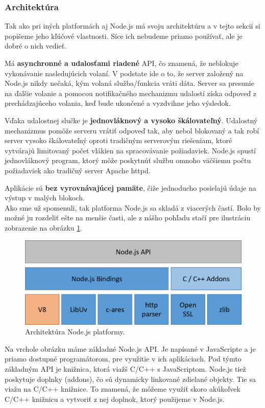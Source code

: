 \subsubsection{Architektúra}
Tak ako pri iných platformách aj Node.js má svoju architektúru a v tejto sekcií si popišeme jeho kľúčové vlastnosti. Síce ich nebudeme priamo používať, ale je dobré o nich vedieť.

Má \textbf{asynchronné a udalosťami riadené} API, čo znamená, že neblokuje vykonávanie nasledujúcich volaní. V podstate ide o to, že server založený na Node.js nikdy nečaká, kým volaná služba/funkcia vráti dáta. Server sa presunie na ďalšie volanie a pomocou notifikačného mechanizmu udalostí získa odpoveď z prechádzajúceho volania, keď bude ukončené a vyzdvihne jeho výsledok.

Vďaka udalostnej slučke je \textbf{jednovláknový a vysoko škálovateľný}. Udalostný mechanizmus pomôže serveru vrátiť odpoveď tak, aby nebol blokovaný a tak robí server vysoko škálovateľný oproti tradičným serverovým riešeniam, ktoré vytvárajú limitovaný počet vlákien na spracovávanie požiadaviek. Node.js spustí jednovláknový program, ktorý môže poskytnúť službu omnoho väčšiemu počtu požiadaviek ako tradičný server Apache httpd. 

Aplikácie sú \textbf{bez vyrovnávajúcej pamäte}, čiže jednoducho posielajú údaje na výstup v malých blokoch.\\

Ako sme už spomenuli, tak platforma Node.js sa skladá z viacerých častí. Bolo by možné ju rozdeliť ešte na menšie časti, ale z nášho pohľadu stačí pre ilustráciu zobrazenie na obrázku \ref{img-node-arch}.

\begin{figure}[H]
  \centering
  \includegraphics[scale=0.7]{img/node/nodejs-arch.png}
  \caption{Architektúra Node.js platformy.}
  \label{img-node-arch}
\end{figure}

Na vrchole obrázku máme základné Node.js API. Je napísané v JavaScripte a je priamo dostupné programátorom, pre využitie v ich aplikáciach. Pod týmto základným API je knižnica, ktorá viažš C/C++ s JavaScriptom. Node.js tiež poskytuje doplnky (addons), čo sú dynamicky linkované zdielané objekty. Tie sa viažu na C/C++ knižnice. To znamená, že môžeme využiť skoro akúkoľvek C/C++ knižnicu a vytvoriť z nej doplnok, ktorý použijeme v Node.js.\\

